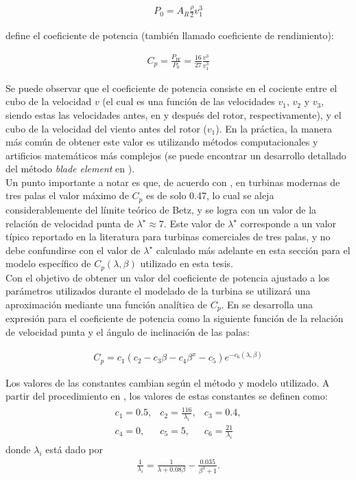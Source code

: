 \begin{align}
    P_0 = A_R\frac{\rho}{2}v_1^3
\end{align}

define el coeficiente de potencia (también llamado coeficiente de rendimiento):

\begin{align}
    C_p = \frac{P_W}{P_0} = \frac{16}{27}\frac{v^3}{v_1^3}
\end{align} 

Se puede observar que el coeficiente de potencia consiste en el cociente entre el cubo de la velocidad $v$ 
(el cual es una función de las velocidades $v_1$, $v_2$ y $v_3$, siendo estas las velocidades antes, en 
y después del rotor, respectivamente), y el cubo de la velocidad del viento antes del rotor ($v_1$). En 
la práctica, la manera más común de obtener este valor es utilizando métodos 
computacionales y artificios matemáticos más complejos (se puede encontrar un desarrollo detallado del 
método \emph{blade element} en \cite{heier2014}).
\\

Un punto importante a notar es que, de acuerdo con \cite{Burton2011}, en turbinas modernas de tres palas 
el valor máximo de $C_p$ es de solo 0.47, lo cual se aleja considerablemente del límite teórico de Betz, 
y se logra con un valor de la relación de velocidad punta de $\lambda^\star \approx 7$. Este valor de 
$\lambda^\star$ corresponde a un valor típico reportado en la literatura para turbinas comerciales de 
tres palas, y no debe confundirse con el valor de $\lambda^\star$ calculado más adelante en esta sección 
para el modelo específico de $C_p(\lambda,\beta)$ utilizado en esta tesis.
\\

Con el objetivo de obtener un valor del coeficiente de potencia ajustado a los parámetros utilizados durante 
el modelado de la turbina se utilizará una aproximación mediante una función analítica de $C_p$.
En \cite{man1981} se desarrolla una expresión para el coeficiente de potencia como la siguiente función de 
la relación de velocidad punta y el ángulo de inclinación de las palas:

\begin{align}
    C_p = c_1 \left( c_2 - c_3\beta - c_4\beta^x - c_5 \right) e^{-c_6(\lambda,\beta)}
    \label{eq:cp_analytic}
\end{align}

Los valores de las constantes cambian según el método y modelo utilizado. A partir del procedimiento en 
\cite{amlang1992}, los valores de estas constantes se definen como:
\begin{align}
    \begin{array}{lll}
        c_1 = 0.5, &c_2 = \frac{116}{\lambda_i}, &c_3 = 0.4,
        \\
        c_4 = 0, &c_5 = 5, &c_6 = \frac{21}{\lambda_i}
    \end{array}
    \label{eq:cp_constants}
\end{align}
donde $\lambda_i$ está dado por
\begin{align}
    \frac{1}{\lambda_i} = \frac{1}{\lambda + 0.08\beta} - \frac{0.035}{\beta^3 + 1}.
    \label{eq:lambda_i}
\end{align}

